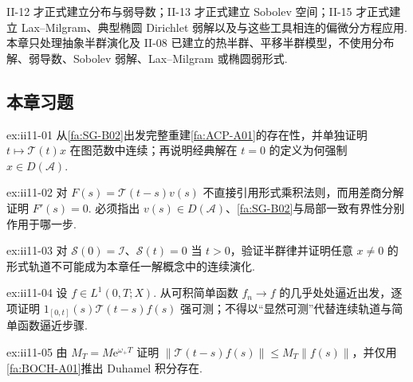 \begin{FAWarning}[II-12、II-13 与 II-15的理论边界]
II-12 才正式建立分布与弱导数；II-13 才正式建立 Sobolev 空间；II-15 才正式建立 Lax--Milgram、典型椭圆 Dirichlet 弱解以及与这些工具相连的偏微分方程应用. 本章只处理抽象半群演化及 II-08 已建立的热半群、平移半群模型，不使用分布解、弱导数、Sobolev 弱解、Lax--Milgram 或椭圆弱形式.
\end{FAWarning}

\subsection*{本章习题}\label{sec:ii11-exercises}

\begin{FAExercise}{ex:ii11-01}
从\autoref{fa:SG-B02}出发完整重建\autoref{fa:ACP-A01}的存在性，并单独证明 \(\displaystyle t\mapsto\mathcal T(t)x\) 在图范数中连续；再说明经典解在 \(\displaystyle t=0\) 的定义为何强制 \(\displaystyle x\in D(\mathcal A)\).
\end{FAExercise}

\begin{FAExercise}[经典唯一性的差商合法性]{ex:ii11-02}
对 \(\displaystyle F(s)=\mathcal T(t-s)v(s)\) 不直接引用形式乘积法则，而用差商分解证明 \(\displaystyle F'(s)=0\). 必须指出 \(\displaystyle v(s)\in D(\mathcal A)\)、\autoref{fa:SG-B02}与局部一致有界性分别作用于哪一步.
\end{FAExercise}

\begin{FAExercise}[非 \(\displaystyle C_0\) 失效]{ex:ii11-03}
对 \(\displaystyle\mathcal S(0)=\mathcal I\)、\(\displaystyle\mathcal S(t)=0\) 当 \(\displaystyle t>0\)，验证半群律并证明任意 \(\displaystyle x\neq0\) 的形式轨道不可能成为本章任一解概念中的连续演化.
\end{FAExercise}

\begin{FAExercise}{ex:ii11-04}
设 \(\displaystyle f\in L^1(0,T;X)\). 从可积简单函数 \(\displaystyle f_n\to f\) 的几乎处处逼近出发，逐项证明 \(\displaystyle1_{[0,t]}(s)\mathcal T(t-s)f(s)\) 强可测；不得以“显然可测”代替连续轨道与简单函数逼近步骤.
\end{FAExercise}

\begin{FAExercise}{ex:ii11-05}
由 \(\displaystyle M_T=M\mathrm{e}^{\omega_+T}\) 证明 \(\displaystyle\|\mathcal T(t-s)f(s)\|\leqslant M_T\|f(s)\|\)，并仅用\autoref{fa:BOCH-A01}推出 Duhamel 积分存在.
\end{FAExercise}

